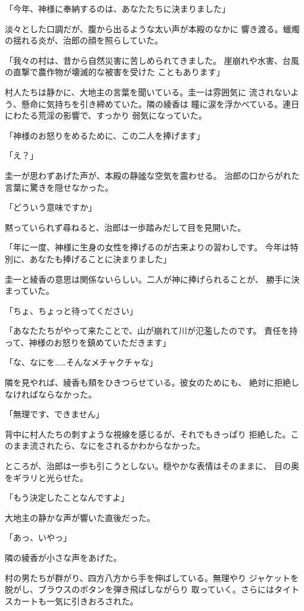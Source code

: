 ﻿\documentclass[
    book,tate,
    line_length=30zw,
    jafontsize=12pt,
    paper=b5j,
    landscape,
    ]{jlreq}
\begin{document}
「今年、神様に奉納するのは、あなたたちに決まりました」

淡々とした口調だが、腹から出るような太い声が本殿のなかに
響き渡る。蠟燭の揺れる炎が、治郎の顔を照らしていた。

「我々の村は、昔から自然災害に苦しめられてきました。
崖崩れや水害、台風の直撃で農作物が壊滅的な被害を受けた
こともあります」

村人たちは静かに、大地主の言葉を聞いている。圭一は雰囲気に
流されないよう、懸命に気持ちを引き締めていた。隣の綾香は
瞳に涙を浮かべている。連日にわたる荒淫の影響で、すっかり
弱気になっていた。

「神様のお怒りをめるために、この二人を捧げます」

「え？」

圭一が思わずあげた声が、本殿の静謐な空気を震わせる。
治郎の口からがれた言葉に驚きを隠せなかった。

「どういう意味ですか」

黙っていられず尋ねると、治郎は一歩踏みだして目を見開いた。

「年に一度、神様に生身の女性を捧げるのが古来よりの習わしです。
今年は特別に、あなたも捧げることに決まりました」

圭一と綾香の意思は関係ないらしい。二人が神に捧げられることが、
勝手に決まっていた。

「ちょ、ちょっと待ってください」

「あなたたちがやって来たことで、山が崩れて川が氾濫したのです。
責任を持って、神様のお怒りを鎮めていただきます」

「な、なにを……そんなメチャクチャな」

隣を見やれば、綾香も頬をひきつらせている。彼女のためにも、
絶対に拒絶しなければならなかった。

「無理です、できません」

背中に村人たちの刺すような視線を感じるが、それでもきっぱり
拒絶した。このまま流されたら、なにをされるかわからなかった。

ところが、治郎は一歩も引こうとしない。穏やかな表情はそのままに、
目の奥をギラリと光らせた。

「もう決定したことなんですよ」

大地主の静かな声が響いた直後だった。

「あっ、いやっ」

隣の綾香が小さな声をあげた。

村の男たちが群がり、四方八方から手を伸ばしている。無理やり
ジャケットを脱がし、ブラウスのボタンを弾き飛ばしながらり
取っていく。さらにはタイトスカートも一気に引きおろされた。
\end{document}
